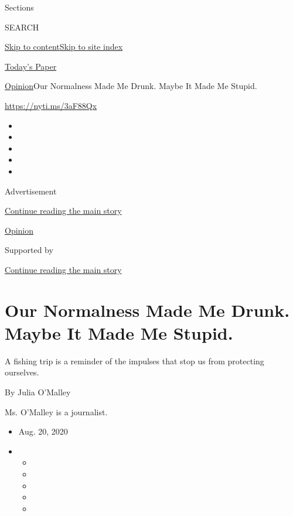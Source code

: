 Sections

SEARCH

\protect\hyperlink{site-content}{Skip to
content}\protect\hyperlink{site-index}{Skip to site index}

\href{https://myaccount.nytimes3xbfgragh.onion/auth/login?response_type=cookie\&client_id=vi}{}

\href{https://www.nytimes3xbfgragh.onion/section/todayspaper}{Today's
Paper}

\href{/section/opinion}{Opinion}\textbar{}Our Normalness Made Me Drunk.
Maybe It Made Me Stupid.

\url{https://nyti.ms/3aF88Qx}

\begin{itemize}
\item
\item
\item
\item
\item
\end{itemize}

Advertisement

\protect\hyperlink{after-top}{Continue reading the main story}

\href{/section/opinion}{Opinion}

Supported by

\protect\hyperlink{after-sponsor}{Continue reading the main story}

\hypertarget{our-normalness-made-me-drunk-maybe-it-made-me-stupid}{%
\section{Our Normalness Made Me Drunk. Maybe It Made Me
Stupid.}\label{our-normalness-made-me-drunk-maybe-it-made-me-stupid}}

A fishing trip is a reminder of the impulses that stop us from
protecting ourselves.

By Julia O'Malley

Ms. O'Malley is a journalist.

\begin{itemize}
\item
  Aug. 20, 2020
\item
  \begin{itemize}
  \item
  \item
  \item
  \item
  \item
  \end{itemize}
\end{itemize}

